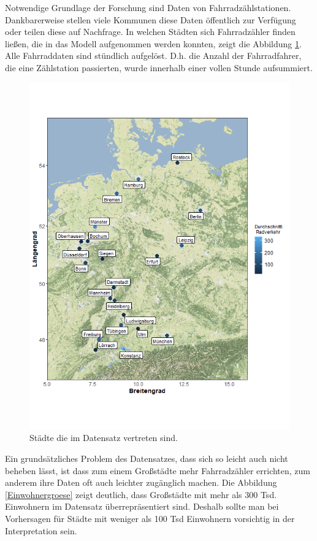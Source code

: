 \documentclass[a4paper,12pt]{thesis}
\begin{document}
Notwendige Grundlage der Forschung sind Daten von Fahrradzählstationen. Dankbarerweise stellen viele Kommunen diese Daten öffentlich zur Verfügung oder teilen diese auf Nachfrage. In welchen Städten sich Fahrradzähler finden ließen, die in das Modell aufgenommen werden konnten, zeigt die Abbildung \ref{Deutschlandkarte}. Alle Fahrraddaten sind stündlich aufgelöst. D.h. die Anzahl der Fahrradfahrer, die eine Zählstation passierten, wurde innerhalb einer vollen Stunde aufsummiert.
\begin{figure}[!ht]
	\centering
	\includegraphics[width=\textwidth]{Plots/plot22.png}
	\caption{Städte die im Datensatz vertreten sind.}
	\label{Deutschlandkarte}
\end{figure}

Ein grundsätzliches Problem des Datensatzes, dass sich so leicht auch nicht beheben lässt, ist dass zum einem Großstädte mehr Fahrradzähler errichten, zum anderem ihre Daten oft auch leichter zugänglich machen. Die Abbildung \ref{Einwohnergroese} zeigt deutlich, dass Großstädte mit mehr als 300 Tsd. Einwohnern im Datensatz überrepräsentiert sind. Deshalb sollte man bei Vorhersagen für Städte mit weniger als 100 Tsd Einwohnern vorsichtig in der Interpretation sein.
\end{document}

